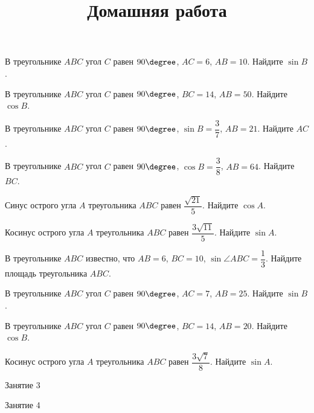 \begin{class}[number=2]
	\begin{listofex}
		\item   В треугольнике \( ABC \) угол \( C \) равен \( 90\degree \), \( AC=6 \), \( AB=10 \). Найдите \( \sin B \).
		\item В треугольнике \( ABC \) угол \( C \) равен \( 90\degree \), \( BC=14 \), \( AB=50 \). Найдите \( \cos B \).
		\item В треугольнике \( ABC \) угол \( C \) равен  \( 90\degree \), \( \sin B=\dfrac{3}{7} \), \( AB=21 \). Найдите \( AC \).
		\item В треугольнике \( ABC \) угол \( C \) равен  \( 90\degree \), \( \cos B=\dfrac{3}{8} \), \( AB=64 \). Найдите \( BC \).
		\item Синус острого угла \( A \) треугольника \( ABC \) равен \( \dfrac{\sqrt{21}}{5} \). Найдите \( \cos A \).
		\item Косинус острого угла \( A \) треугольника \( ABC \) равен \( \dfrac{3\sqrt{11}}{5} \). Найдите \( \sin A \).
		\item В треугольнике \( ABC \) известно, что \( AB=6 \), \( BC=10 \), \( \sin\angle ABC=\dfrac{1}{3} \). Найдите площадь треугольника \( ABC \).
	\end{listofex}
	\newpage
	\title{Домашняя работа}
	\begin{listofex}
		\item В треугольнике \( ABC \) угол \( C \) равен \( 90\degree \), \( AC=7 \), \( AB=25 \). Найдите \( \sin B \).
		\item В треугольнике \( ABC \) угол \( C \) равен \( 90\degree \), \( BC=14 \), \( AB=20 \). Найдите \( \cos B \).
		\item Косинус острого угла \( A \) треугольника \( ABC \) равен \( \dfrac{3\sqrt{7}}{8} \). Найдите \( \sin A \).
	\end{listofex}
\end{class}

\begin{class}[number=3]
	\begin{listofex}
		\item Занятие 3 
	\end{listofex}
\end{class}

\begin{class}[number=4]
	\begin{listofex}
		\item Занятие 4
	\end{listofex}
\end{class}
